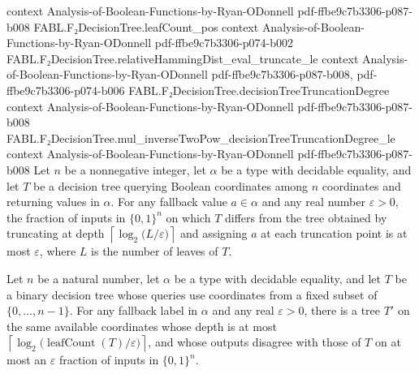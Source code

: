 \begin{theorem}
  {context}
  {Analysis-of-Boolean-Functions-by-Ryan-ODonnell}
  {pdf-ffbe9c7b3306-p087-b008}
\proofstep
  {FABL.F₂DecisionTree.leafCount_pos}
  {context}
  {Analysis-of-Boolean-Functions-by-Ryan-ODonnell}
  {pdf-ffbe9c7b3306-p074-b002}
\proofstep
  {FABL.F₂DecisionTree.relativeHammingDist_eval_truncate_le}
  {context}
  {Analysis-of-Boolean-Functions-by-Ryan-ODonnell}
  {pdf-ffbe9c7b3306-p087-b008,
    pdf-ffbe9c7b3306-p074-b006}
\proofstep
  {FABL.F₂DecisionTree.decisionTreeTruncationDegree}
  {context}
  {Analysis-of-Boolean-Functions-by-Ryan-ODonnell}
  {pdf-ffbe9c7b3306-p087-b008}
\proofstep
  {FABL.F₂DecisionTree.mul_inverseTwoPow_decisionTreeTruncationDegree_le}
  {context}
  {Analysis-of-Boolean-Functions-by-Ryan-ODonnell}
  {pdf-ffbe9c7b3306-p087-b008}
Let $n$ be a nonnegative integer, let $\alpha$ be a type with decidable equality, and
let $T$ be a decision tree querying Boolean coordinates among $n$ coordinates and
returning values in $\alpha$. For any fallback value $a\in\alpha$ and any real number
$\varepsilon>0$, the fraction of inputs in $\{0,1\}^n$ on which $T$ differs from the
tree obtained by truncating at depth
$\left\lceil\log_2\bigl(L/\varepsilon\bigr)\right\rceil$ and assigning $a$ at each
truncation point is at most $\varepsilon$, where $L$ is the number of leaves of $T$.
\end{theorem}

\begin{theorem}
\leanok
{}
Let $n$ be a natural number, let $\alpha$ be a type with decidable equality, and let $T$
be a binary decision tree whose queries use coordinates from a fixed subset of
$\{0,\ldots,n-1\}$. For any fallback label in $\alpha$ and any real $\varepsilon>0$,
there is a tree $T'$ on the same available coordinates whose depth is at most
$\left\lceil\log_2\bigl(\operatorname{leafCount}(T)/\varepsilon\bigr)\right\rceil$, and
whose outputs disagree with those of $T$ on at most an $\varepsilon$ fraction of inputs
in $\{0,1\}^n$.
\end{theorem}

